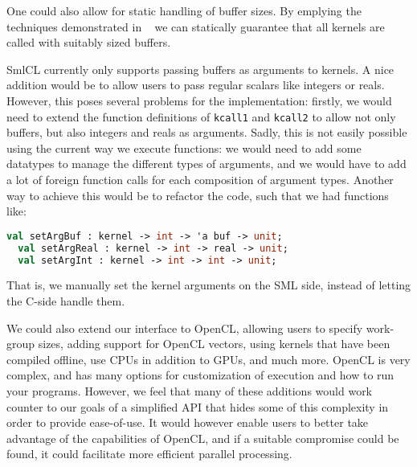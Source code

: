 One could also allow for static handling of buffer
sizes. By emplying the techniques demonstrated in ~\cite{buffersize}
we can statically guarantee that all kernels are called with suitably
sized buffers.

SmlCL currently only supports passing buffers as arguments to
kernels. A nice addition would be to allow users to pass regular
scalars like integers or reals. However, this poses several problems
for the implementation: firstly, we would need to extend the function
definitions of \texttt{kcall1} and \texttt{kcall2} to allow not only
buffers, but also integers and reals as arguments. Sadly, this is not
easily possible using the current way we execute functions: we would
need to add some datatypes to manage the different types of arguments,
and we would have to add a lot of foreign function calls for each
composition of argument types. Another way to achieve this would be to
refactor the code, such that we had functions like:

\begin{lstlisting}[language=ML,mathescape]
  val setArgBuf : kernel -> int -> 'a buf -> unit;
  val setArgReal : kernel -> int -> real -> unit;
  val setArgInt : kernel -> int -> int -> unit;
\end{lstlisting}

That is, we manually set the kernel arguments on the SML side, instead
of letting the C-side handle them.

We could also extend our interface to OpenCL, allowing users to
specify work-group sizes, adding support for OpenCL vectors, using
kernels that have been compiled offline, use CPUs in addition to GPUs,
and much more. OpenCL is very complex, and has many options for
customization of execution and how to run your programs. However, we
feel that many of these additions would work counter to our goals of a
simplified API that hides some of this complexity in order to provide
ease-of-use. It would however enable users to better take advantage of
the capabilities of OpenCL, and if a suitable compromise could be
found, it could facilitate more efficient parallel processing.

